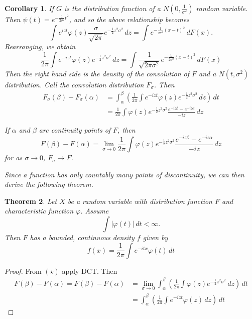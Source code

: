 \documentclass[10pt, oneside, reqno]{amsart}
\theoremstyle{plain}%
\newtheorem{thm}{Theorem}[section]
\newtheorem{cor}[thm]{Corollary}
\theoremstyle{definition}
\theoremstyle{remark}
\renewcommand{\phi}{\varphi}
\begin{document}
\begin{cor}
    If $G$ is the distribution function of a $N(0, \frac{1}{\sigma^2})$ random variable.  Then $\psi(t) = e^{-\frac{1}{2\sigma^2} t^2}$, and so the above relationship becomes \[
        \int e^{izt} \phi(z) \frac{\sigma}{\sqrt{2\pi}} e^{-\frac{1}{2}z^2 \sigma^2} \, dz = \int e^{-\frac{1}{2\sigma^2}(x-t)^2} \, dF(x).
    \]  Rearranging, we obtain \[
        \frac{1}{2\pi} \int e^{-izt} \phi(z) e^{-\frac{1}{2} z^2 \sigma^2} \, dz = \int \frac{1}{\sqrt{2 \pi \sigma^2}} e^{- \frac{1}{2 \sigma^2}(x - t)^2} \, dF(x)
    \]  Then the right hand side is the density of the convolution of $F$ and a $N(t, \sigma^2)$ distribution.  Call the convolution distribution $F_\sigma$.  Then \begin{align*}
        F_\sigma(\beta) - F_\sigma(\alpha) &= \int_\alpha^\beta \left(  \frac{1}{2\pi} \int e^{-izt} \phi(z) e^{-\frac{1}{2} z^2 \sigma^2} \, dz \right) \, dt \\
        &= \frac{1}{2\pi} \int \phi(z) e^{-\frac{1}{2} z^2 \sigma^2} \frac{e^{-iz\beta} - e^{-iz\alpha}}{-iz} \, dz
    \end{align*}
    
    If $\alpha$ and $\beta$ are continuity points of $F$, then \[
        F(\beta) - F(\alpha) = \lim_{\sigma \rightarrow 0} \frac{1}{2 \pi} \int \phi(z) e^{-\frac{1}{2} z^2 \sigma^2} \frac{e^{-iz\beta} - e^{-iz\alpha}}{-iz} \, dz \tag{$\star$}
    \] for as $\sigma \rightarrow 0$, $F_\sigma \rightarrow F$.  
    
    Since a function has only countably many points of discontinuity, we can then derive the following theorem.
\end{cor}

\begin{thm}
    Let $X$ be a random variable with distribution function $F$ and characteristic function $\phi$.  Assume \[
        \int | \phi(t) | \, dt < \infty.
    \]  Then $F$ has a bounded, continuous density $f$ given by \[
        f(x) = \frac{1}{2\pi} \int e^{-itx} \phi(t) \, dt
    \]
\end{thm}

\begin{proof}
    From $(\star)$ apply DCT.  Then \begin{align*}
        F(\beta) - F(\alpha) = F(\beta) - F(\alpha) &= \lim_{\sigma \rightarrow 0} \int_\alpha^\beta \left( \frac{1}{2 \pi} \int \phi(z) e^{-\frac{1}{2} z^2 \sigma^2} \, dz \right) \, dt \\
        &= \int_\alpha^\beta \left( \frac{1}{2 \pi} \int e^{-izt} \phi(z) \, dz \right) \, dt 
    \end{align*}
\end{proof}
\end{document}
